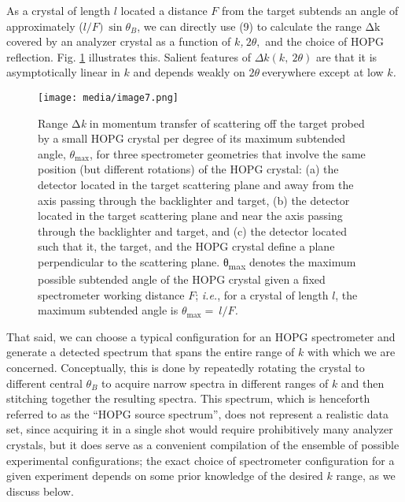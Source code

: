 As a crystal of length \(l\) located a distance \(F\) from the target
subtends an angle of approximately (\(l/F)\ \sin\theta_{B}\), we can
directly use (9) to calculate the range \(\text{Δk}\) covered by an
analyzer crystal as a function of \(k\)\emph{,}\(\ 2\theta,\) and the
choice of HOPG reflection. Fig. \ref{edimage7} illustrates this. Salient features of
\(\Delta k(k,\ 2\theta)\) are that it is asymptotically linear in \(k\)
and depends weakly on \(2\theta\ \)everywhere except at low
\(k\)\emph{.}

\begin{figure}[h] \label{edimage7}
\caption{ Range Δ\emph{k} in momentum transfer of scattering off the
target probed by a small HOPG crystal per degree of its maximum
subtended angle, \(\theta_{\max}\), for three spectrometer geometries
that involve the same position (but different rotations) of the HOPG
crystal: (a) the detector located in the target scattering plane and
away from the axis passing through the backlighter and target, (b) the
detector located in the target scattering plane and near the axis
passing through the backlighter and target, and (c) the detector located
such that it, the target, and the HOPG crystal define a plane
perpendicular to the scattering plane. θ\textsubscript{max} denotes the
maximum possible subtended angle of the HOPG crystal given a fixed
spectrometer working distance \(F\); \emph{i.e.}, for a crystal of
length \(l\), the maximum subtended angle is
\(\theta_{\max} = \ l/F\)\emph{.}}
\centering
\texttt{[image: media/image7.png]}
\end{figure}

That said, we can choose a typical configuration for an HOPG
spectrometer and generate a detected spectrum that spans the entire
range of \(k\) with which we are concerned. Conceptually, this is done
by repeatedly rotating the crystal to different central \(\theta_{B}\)
to acquire narrow spectra in different ranges of \(k\) and then
stitching together the resulting spectra. This spectrum, which is
henceforth referred to as the ``HOPG source spectrum'', does not
represent a realistic data set, since acquiring it in a single shot
would require prohibitively many analyzer crystals, but it does serve as
a convenient compilation of the ensemble of possible experimental
configurations; the exact choice of spectrometer configuration for a
given experiment depends on some prior knowledge of the desired \(k\)
range, as we discuss below.

